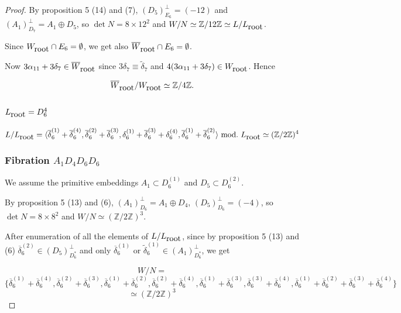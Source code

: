 \documentclass{amsart}
\begin{document}
\begin{proof}
By proposition 5 (14) and (7), $(D_5)_{E_6}^{\perp} =(-12)$ and $(A_1)_{D_7}^{\perp}=A_1 \oplus D_5$, so $\det N=8\times 12^2$ and $W/N \simeq \mathbb Z / 12 \mathbb Z \simeq L/L_{\hbox{root}}$.


Since $W_{\hbox{root}}\cap E_6 = \emptyset $, we get also $\overline{W}_{\hbox{root}} \cap E_6 =\emptyset$.

Now $3\alpha_{11}+3\delta_7\in \overline{W}_{\hbox{root}}$ since $3\delta_7 \equiv \tilde{\delta}_7$ and $4(3\alpha_{11}+3\delta_7)\in W_{\hbox{root}}$. Hence


$$\overline{W}_{\hbox{root}}/W_{\hbox{root}}\simeq \mathbb Z /4\mathbb Z.$$





\subsection{$L_{\hbox{root}}=D_6^4$}

$$L/L_{\hbox{root}}=\langle \overline{\delta}_6^{(1)}+\overline{\delta}_6^{(4)},\overline{\delta}_6^{(2)}+\overline{\delta}_6^{(3)},\delta_6^{(1)}+\overline{\delta}_6^{(3)}+\delta_6^{(4)},\overline{\delta}_6^{(1)}+\overline{\delta}_6^{(2)}\rangle\,\, {\hbox{mod.}}\,\, L_{\hbox{root}} \simeq (\mathbb Z/2\mathbb Z)^4$$

\subsubsection{Fibration $A_1D_4D_6D_6$}

We assume the primitive embeddings $A_1 \subset D_6^{(1)}$ and $D_5 \subset D_6^{(2)}$.

By proposition 5 (13) and (6), $(A_1)_{D_6}^{\perp}=A_1\oplus D_4$, $(D_5)_{D_6}^{\perp}=(-4)$, so $\det N=8\times 8^2$ and $W/N\simeq (\mathbb Z/2 \mathbb Z)^3$.

After enumeration of all the elements of $L/L_{\hbox{root}}$, since by proposition 5 (13) and (6) $\overline{\delta}_6^{(2)}\in (D_5)_{D_6^*}^{\perp}$ and only $\overline{\delta}_6^{(1)}$ or $\tilde{\delta}_6^{(1)}\in(A_1)_{D_6^*}^{\perp}$, we get 

$$W/N=$$
$$\{\overline{\delta}_6^{(1)}+\overline{\delta}_6^{(4)},\overline{\delta}_6^{(2)}+\overline{\delta}_6^{(3)},\overline{\delta}_6^{(1)}+\overline{\delta}_6^{(2)},\overline{\delta}_6^{(2)}+\overline{\delta}_6^{(4)},\overline{\delta}_6^{(1)}+\overline{\delta}_6^{(3)},\overline{\delta}_6^{(3)}+\overline{\delta}_6^{(4)},\overline{\delta}_6^{(1)}+\overline{\delta}_6^{(2)}+\overline{\delta}_6^{(3)}+\overline{\delta}_6^{(4)}\}$$
$$\simeq (\mathbb Z/2 \mathbb Z)^3$$


\end{proof}
\end{document}
